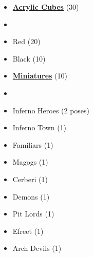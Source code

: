 \begin{multicols*}{3}
\begin{itemize}[leftmargin=0pt, label={}, noitemsep]
  \item \textbf{\small{\underline{Acrylic Cubes}}} (30)
  \item
  \item Red (20)
  \item Black (10)
\end{itemize}

\begin{itemize}[leftmargin=0pt, label={}, noitemsep]
  \item \textbf{\small{\underline{Miniatures}}} (10)
  \item
  \item Inferno Heroes (2 poses)
  \item Inferno Town (1)
  \item Familiars (1)
  \item Magogs (1)
  \item Cerberi (1)
  \item Demons (1)
  \item Pit Lords (1)
  \item Efreet (1)
  \item Arch Devils (1)
\end{itemize}


\end{multicols*}
